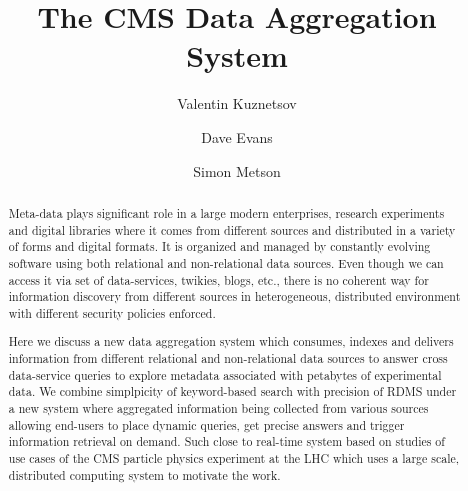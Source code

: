 \documentclass[a4paper]{jpconf}
\begin{document}
\title{The CMS Data Aggregation System}

\author{Valentin Kuznetsov}
\address{Cornell University, Ithaca, New York, USA}

\author{Dave Evans}
\address{Fermilab, Batavia, Illinois, USA}

\author{Simon Metson}
\address{Bristol University, Bristol, UK}



\begin{abstract}

Meta-data plays signiﬁcant role in a large modern enterprises, 
research experiments and digital libraries where it comes from different 
sources and distributed in a variety of forms and digital formats. 
It is organized and managed by constantly evolving software using 
both relational and non-relational data sources. 
Even though we can access it via set of data-services, twikies, blogs, etc.,
there is no coherent way for information discovery from different sources
in heterogeneous, distributed environment with different security policies enforced.

Here we discuss a new data aggregation system which consumes, 
indexes and delivers information from different relational and 
non-relational data sources to answer cross data-service queries 
to explore metadata associated with petabytes of experimental data. 
We combine simplpicity of keyword-based search with precision of RDMS
under a new system where aggregated information being collected from various sources 
allowing end-users to place dynamic queries, get precise answers and 
trigger information retrieval on demand. Such close to real-time system 
based on studies  of use cases of the CMS particle physics experiment at 
the LHC which uses a large scale, distributed computing system to motivate the work.

\end{abstract}
\end{document}
